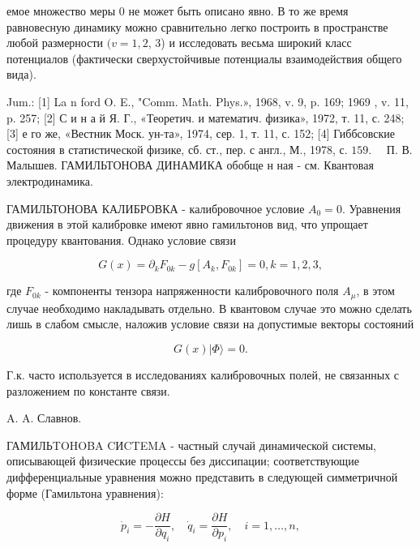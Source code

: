 \documentclass[10pt]{article}
\begin{document}
емое множество меры 0 не может быть описано явно. В то же время равновесную динамику можно сравнительно легко построить в пространстве любой размерности $(v=1,2$, 3) и исследовать весьма широкий класс потенциалов (фактически сверхустойчивые потенциалы взаимодействия общего вида).



Jum.: [1] La n ford O. E., "Comm. Math. Phys.», 1968, v. 9, p. 169; 1969 , v. 11, p. 257; [2] С и н а й Я. Г., «Теоретич. и математич. физика», 1972, т. 11, с. 248; [3] е го же, «Вестник Моск. ун-та», 1974, сер. 1, т. 11, с. 152; [4] Гиббсовские состояния в статистической физике, сб. ст., пер. с англ., М., 1978, с. $159 . \quad$ П. В. Малышев. ГАМИЛЬТОНОВА ДИНАМИКА обобще н ная - см. Квантовая электродинамика.



ГАМИЛЬТОНОВА КАЛИБРОВКА - калибровочное условие $A_{0}=0$. Уравнения движения в этой калибровке имеют явно гамильтонов вид, что упрощает процедуру квантования. Однако условие связи



\[

G(x)=\partial_{k} F_{0 k}-g\left[A_{k}, F_{0 k}\right]=0, k=1,2,3,

\]



где $F_{0 k}$ - компоненты тензора напряженности калибровочного поля $A_{\mu}$, в этом случае необходимо накладывать отдельно. В квантовом случае это можно сделать лишь в слабом смысле, наложив условие связи на допустимые векторы состояний



\[

G(x)|\Phi\rangle=0 .

\]



Г.к. часто используется в исследованиях калибровочных полей, не связанных с разложением по константе связи.



A. A. Славнов.



ГАМИЛЬTOHOBA CИCTEMA - частный случай динамической системы, описывающей физические процессы без диссипации; соответствующие дифференциальные уравнения можно представить в следующей симметричной форме (Гамильтона уравнения):



\[

\dot{p}_{i}=-\frac{\partial H}{\partial q_{i}}, \quad \dot{q}_{i}=\frac{\partial H}{\partial p_{i}}, \quad i=1, \ldots, n,

\]
\end{document}
